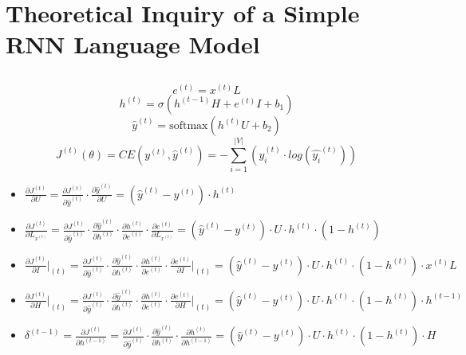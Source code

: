 \documentclass{article}
\begin{document}
\section{Theoretical Inquiry of a Simple RNN Language Model}
\subsection{} %
\begin{equation*}
    e^{(t)}=x^{(t)}L
\end{equation*}
\begin{equation*}
    h^{(t)}=\sigma(h^{(t-1)}H + e^{(t)}I + b_{1})
\end{equation*}
\begin{equation*}
    \hat{y}^{(t)}=\text{softmax}(h^{(t)}U+b_{2})
\end{equation*}
\begin{equation*}
    J^{(t)}(\theta)=CE(y^{(t)}, \hat{y}^{(t)}) = - \sum_{i=1}^{|V|}(y_{i}^{(t)}\cdot log(\hat{y_{i}}^{(t)}))
\end{equation*}
\begin{itemize}
    \item $\frac{\partial J^{(t)} }{\partial U} =
     \frac{\partial J^{(t)} }{\partial \hat{y}^{(t)}} \cdot \frac{\partial \hat{y}^{(t)}}{\partial U} = (\hat{y}^{(t)} - y^{(t)}) \cdot h^{(t)}$
    \item $\frac{\partial J^{(t)} }{\partial L_{x^{(t)}}} =
    \frac{\partial J^{(t)} }{\partial \hat{y}^{(t)}} \cdot
    \frac{\partial \hat{y}^{(t)}}{\partial h^{(t)}} \cdot
    \frac{\partial h^{(t)}}{\partial e^{(t)}} \cdot
    \frac{\partial e^{(t)}}{\partial L_{x^{(t)}}} =
    (\hat{y}^{(t)} - y^{(t)}) \cdot U \cdot h^{(t)} \cdot (1 - h^{(t)})$
    \item $\frac{\partial J^{(t)} }{\partial I}\vert_{(t)}  =
    \frac{\partial J^{(t)} }{\partial \hat{y}^{(t)}} \cdot \frac{\partial \hat{y}^{(t)}}{\partial h^{(t)}} \cdot \frac{\partial h^{(t)}}{\partial e^{(t)}} \cdot \frac{\partial e^{(t)}}{\partial I}\vert_{(t)} =
    (\hat{y}^{(t)} - y^{(t)}) \cdot U \cdot h^{(t)} \cdot (1 - h^{(t)}) \cdot x^{(t)}L$
    \item  $\frac{\partial J^{(t)} }{\partial H}\vert_{(t)} = \frac{\partial J^{(t)} }{\partial \hat{y}^{(t)}} \cdot \frac{\partial \hat{y}^{(t)}}{\partial h^{(t)}} \cdot \frac{\partial h^{(t)}}{\partial e^{(t)}} \cdot \frac{\partial e^{(t)}}{\partial H}\vert_{(t)} =
    (\hat{y}^{(t)} - y^{(t)}) \cdot U \cdot h^{(t)} \cdot (1 - h^{(t)}) \cdot h^{(t-1)}$
    \item $\delta^{(t-1)} = \frac{\partial J^{(t)} }{\partial h^{(t-1)}} = \frac{\partial J^{(t)} }{\partial \hat{y}^{(t)}} \cdot \frac{\partial \hat{y}^{(t)}}{\partial h^{(t)}} \cdot \frac{\partial h^{(t)}}{\partial h^{(t-1)}} = (\hat{y}^{(t)} - y^{(t)}) \cdot U \cdot h^{(t)} \cdot (1 - h^{(t)}) \cdot H$
\end{itemize}
\end{document}
